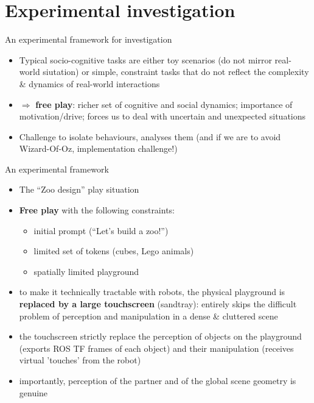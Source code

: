 \documentclass[compress]{beamer}
\begin{document}
\section{Experimental investigation}

\begin{frame}{An experimental framework for investigation}

    \begin{itemize}
        \item<1-> Typical socio-cognitive tasks are either toy scenarios (\ie do not mirror
            real-world siutation) or simple, constraint tasks that do not
            reflect the complexity \& dynamics of real-world interactions
        \item<2-> $\Rightarrow$ {\bf free play}: richer set of cognitive and
            social dynamics; importance of motivation/drive; forces us to deal
            with uncertain and unexpected situations
        \item<3-> Challenge to isolate behaviours, analyses them (and if we are
            to avoid Wizard-Of-Oz, implementation challenge!)
    \end{itemize}
\end{frame}


\begin{frame}{An experimental framework}

    \begin{itemize}
        \item The ``Zoo design'' play situation
        \item {\bf Free play} with the following constraints:
            \begin{itemize}
                \item initial prompt (``Let's build a zoo!'')
                \item limited set of tokens (cubes, Lego animals)
                \item spatially limited playground
            \end{itemize}
        \item<2-> to make it technically tractable with robots, the physical
            playground is {\bf replaced by a large touchscreen} (sandtray): entirely
            skips the difficult problem of perception and manipulation in a
            dense \& cluttered scene
        \item<2-> the touchscreen strictly
            replace the perception of objects on the playground (exports
            ROS TF frames of each object) and their manipulation (receives
            virtual 'touches' from the robot)
        \item<2-> importantly, perception of the partner and of the global scene
            geometry is genuine
    \end{itemize}
\end{frame}
\end{document}
